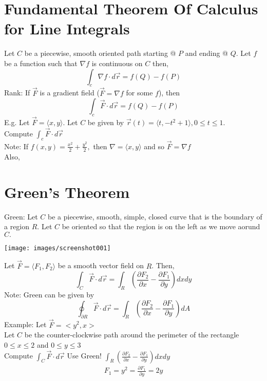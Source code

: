 \documentclass[12pt,letterpaper, onecolumn]{exam}
\begin{document}
		\section*{Fundamental Theorem Of Calculus for Line Integrals}
		Let $C$ be a piecewise, smooth oriented path starting @ $P$ and ending @ $Q$. Let $f$ be a function such that $\nabla f$ is continuous on $C$ then,
		$$\int_c \nabla f \cdot d\vec{r}=f(Q)-f(P)$$
		Rank: If $\vec{F}$ is a gradient field ($\vec{F}=\nabla f$ for some $f$), then 
		$$\int_c \vec{F}\cdot d\vec{r}=f(Q)-f(P)$$
		E.g. Let $\vec{F}=\langle x,y \rangle$. Let $C$ be given by $\vec{r}(t)=\langle t,-t^2+1 \rangle, 0\leq t \leq 1$.\\
		Compute $\int_c \vec{F}\cdot d\vec{r}$\\
		Note: If $f(x,y)=\frac{x^2}{2}+\frac{y^2}{2},$ then $\nabla =\langle x,y \rangle $ and so $\vec{F}=\nabla f$\\
		Also,
		\section*{Green's Theorem}
		Green: Let $C$ be a piecewise, smooth, simple, closed curve that is the boundary of a region $R$. Let $C$ be oriented so that the region is on the left as we move aorund $C.$\\
		\begin{center}
			\texttt{[image: images/screenshot001]}
		\end{center}
		Let $\vec{F}=\langle F_1, F_2 \rangle$ be a smooth vector field on $R$. Then,
		$$\int_C \vec{F}\cdot d\vec{r} = \int_R\left(\frac{\partial F_2}{\partial x}-\frac{\partial F_1}{\partial y}\right)dxdy$$
		Note: Green can be given by
		$$\oint_{\partial R}\vec{F}\cdot d\vec{r}=\int_R\left(\frac{\partial F_2}{\partial x}-\frac{\partial F_1}{\partial y}\right)dA$$
		Example: Let $\vec{F}=<y^2,x>$\\
		Let $C$ be the counter-clockwise path around the perimeter of the rectangle $0\leq x \leq 2$ and $0\leq y \leq 3$\\
		Compute $\int_C \vec{F}\cdot d\vec{r}$
		Use Green! $\int_R\left(\frac{\partial F_2}{\partial x}-\frac{\partial F_1}{\partial y}\right)dxdy$
		\begin{align*}
			F_1=y^2=\frac{\partial F_1}{\partial y}=2y
		\end{align*}
\end{document}
